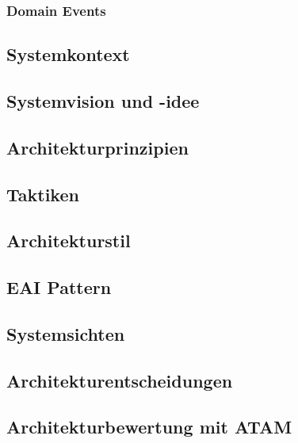 \subsubsection{Domain Events}

\subsection{Systemkontext}
\subsection{Systemvision und -idee}
\subsection{Architekturprinzipien}
\subsection{Taktiken}
\subsection{Architekturstil}
\subsection{EAI Pattern}
\subsection{Systemsichten}
\subsection{Architekturentscheidungen}
\subsection{Architekturbewertung mit ATAM}
